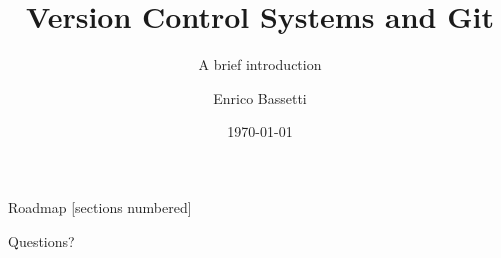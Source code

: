 \documentclass[10pt]{beamer}
\title{Version Control Systems and Git}
\subtitle{A brief introduction}
\date{\today}
\author{Enrico Bassetti}
\institute{Sapienza - University of Rome}
\begin{document}

\maketitle

\begin{frame}{Roadmap}
  [sections numbered]
  \tableofcontents[hideallsubsections]
\end{frame}





\begin{frame}[standout]
  Questions?
\end{frame}

\begin{frame}{}

  \begin{center}\ccbysa\end{center}

\end{frame}
\end{document}
